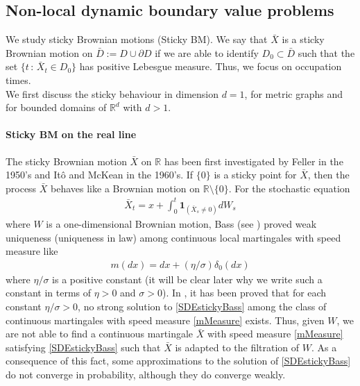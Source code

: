 \documentclass[[11pt,a4paper,reqno]{article}
\numberwithin{equation}{section}
\begin{document}
\subsection{Non-local dynamic boundary value problems}

We study sticky Brownian motions (Sticky BM). We say that $\bar{X}$ is a sticky Brownian motion on $\bar{D}:= D \cup \partial D$ if we are able to identify $D_0 \subset \bar{D}$ such that the set $\{t\,:\, \bar{X}_t \in D_0\}$ has positive Lebesgue measure. Thus, we focus on occupation times. \\ 


We first discuss the sticky behaviour in dimension $d=1$, for metric graphs and for bounded domains of $\mathbb{R}^d$ with $d>1$.

\paragraph{Sticky BM on the real line}
The sticky Brownian motion $\bar{X}$ on $\mathbb{R}$ has been first investigated by Feller in the 1950’s and Itô and McKean in the 1960’s. If $\{0\}$ is a sticky point for $\bar{X}$, then the process $\bar{X}$ behaves like a Brownian motion on $\mathbb{R} \setminus \{0\}$. For the stochastic equation
\begin{align}
\bar{X}_t = x + \int_0^t \mathbf{1}_{(\bar{X}_s \neq 0)} dW_s
\label{SDEstickyBass}
\end{align}
where $W$ is a one-dimensional Brownian motion, Bass (see \cite{BasSticky}) proved weak uniqueness (uniqueness in law) among continuous local martingales with speed measure like  
\begin{align}
m(dx) = dx + (\eta/\sigma) \delta_0(dx)
\label{mMeasure}
\end{align}
where $\eta/\sigma$ is a positive constant (it will be clear later why we write such a constant in terms of $\eta>0$ and $\sigma>0$). In \cite{BasSticky}, it has been proved that for each constant $\eta/\sigma>0$, no strong solution to \eqref{SDEstickyBass} among the class of continuous martingales with speed measure \eqref{mMeasure} exists. Thus, given $W$, we are not able to find a continuous martingale $\bar{X}$ with speed measure \eqref{mMeasure} satisfying \eqref{SDEstickyBass} such that $\bar{X}$ is adapted to the filtration of $W$. As a consequence of this fact, some approximations to the solution of \eqref{SDEstickyBass} do not converge in probability, although they do
converge weakly. 
\end{document}
